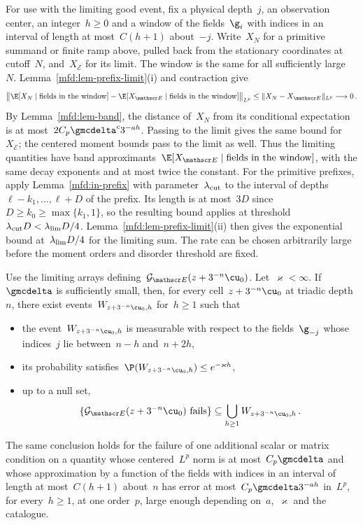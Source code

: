 \documentclass[11pt]{amsart}
\begin{document}
For use with the limiting good event, fix a physical depth~$j$, an observation center, an integer~$h\geq0$ and a window of the fields~$\g_i$ with indices in an interval of length at most~$C(h+1)$ about~$-j$. Write~$X_N$ for a primitive summand or finite ramp above, pulled back from the stationary coordinates at cutoff~$N$, and~$X_{\mathscr E}$ for its limit. The window is the same for all sufficiently large~$N$. Lemma~\ref{mfd:lem-prefix-limit}(i) and contraction give
\begin{align*}
	\bigl\|\E[X_N\mid\text{fields in the window}]-\E[X_{\mathscr E}\mid\text{fields in the window}]\bigr\|_{L^p} \leq\|X_N-X_{\mathscr E}\|_{L^p}\longrightarrow0\,.
\end{align*}
By Lemma~\ref{mfd:lem-band}, the distance of~$X_N$ from its conditional expectation is at most~$2C_p\gmcdelta^c3^{-ah}$. Passing to the limit gives the same bound for~$X_{\mathscr E}$; the centered moment bounds pass to the limit as well. Thus the limiting quantities have band approximants~$\E[X_{\mathscr E}\mid\text{fields in the window}]$, with the same decay exponents and at most twice the constant. For the primitive prefixes, apply Lemma~\ref{mfd:in-prefix} with parameter~$\lambda_{\rm cut}$ to the interval of depths~$\ell-k_1,\ldots,\ell+D$ of the prefix. Its length is at most~$3D$ since~$D\geq k_0\geq\max\{k_1,1\}$, so the resulting bound applies at threshold~$\lambda_{\rm cut}D<\lambda_{\rm lim}D/4$. Lemma~\ref{mfd:lem-prefix-limit}(ii) then gives the exponential bound at~$\lambda_{\rm lim}D/4$ for the limiting sum. The rate can be chosen arbitrarily large before the moment orders and disorder threshold are fixed.

\begin{lemma}
\label{mfd:lem-witness}
Use the limiting arrays defining~$\mathcal G_{\mathscr E}(z+3^{-n}\cu_0)$. Let~$\varkappa<\infty$. If~$\gmcdelta$ is sufficiently small, then, for every cell~$z+3^{-n}\cu_0$ at triadic depth~$n$, there exist events~$W_{z+3^{-n}\cu_0,h}$ for~$h\geq1$ such that
\begin{itemize}
\item the event~$W_{z+3^{-n}\cu_0,h}$ is measurable with respect to the fields~$\g_{-j}$ whose indices~$j$ lie between~$n-h$ and~$n+2h$,
\item its probability satisfies~$\P(W_{z+3^{-n}\cu_0,h})\leq e^{-\varkappa h}$,
\item up to a null set,
\begin{equation*}
	\{\mathcal G_{\mathscr E}(z+3^{-n}\cu_0)\text{ fails}\}\subseteq\bigcup_{h\geq1}W_{z+3^{-n}\cu_0,h}\,.
\end{equation*}
\end{itemize}
The same conclusion holds for the failure of one additional scalar or matrix condition on a quantity whose centered~$L^p$ norm is at most~$C_p\gmcdelta$ and whose approximation by a function of the fields with indices in an interval of length at most~$C(h+1)$ about~$n$ has error at most~$C_p\gmcdelta3^{-ah}$ in~$L^p$, for every~$h\geq1$, at one order~$p$, large enough depending on~$a$,~$\varkappa$ and the catalogue.
\end{lemma}
\end{document}
